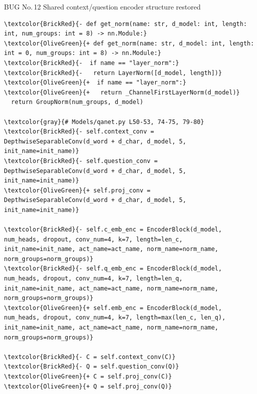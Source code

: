 \documentclass[10pt]{article}
\begin{document}
\begin{bugbox}{BUG No.\,12 \quad Shared context/question encoder structure restored}
\begin{Verbatim}[commandchars=\\\{\},fontsize=\footnotesize,breaklines=true,breaksymbol={},frame=leftline,framerule=2pt,rulecolor=\color{gray!40},xleftmargin=6pt,formatcom=\singlespacing]
\textcolor{BrickRed}{- def get_norm(name: str, d_model: int, length: int, num_groups: int = 8) -> nn.Module:}
\textcolor{OliveGreen}{+ def get_norm(name: str, d_model: int, length: int = 0, num_groups: int = 8) -> nn.Module:}
\textcolor{BrickRed}{-  if name == "layer_norm":}
\textcolor{BrickRed}{-   return LayerNorm([d_model, length])}
\textcolor{OliveGreen}{+  if name == "layer_norm":}
\textcolor{OliveGreen}{+   return _ChannelFirstLayerNorm(d_model)}
  return GroupNorm(num_groups, d_model)

\textcolor{gray}{# Models/qanet.py L50-53, 74-75, 79-80}
\textcolor{BrickRed}{- self.context_conv = DepthwiseSeparableConv(d_word + d_char, d_model, 5, init_name=init_name)}
\textcolor{BrickRed}{- self.question_conv = DepthwiseSeparableConv(d_word + d_char, d_model, 5, init_name=init_name)}
\textcolor{OliveGreen}{+ self.proj_conv = DepthwiseSeparableConv(d_word + d_char, d_model, 5, init_name=init_name)}

\textcolor{BrickRed}{- self.c_emb_enc = EncoderBlock(d_model, num_heads, dropout, conv_num=4, k=7, length=len_c, init_name=init_name, act_name=act_name, norm_name=norm_name, norm_groups=norm_groups)}
\textcolor{BrickRed}{- self.q_emb_enc = EncoderBlock(d_model, num_heads, dropout, conv_num=4, k=7, length=len_q, init_name=init_name, act_name=act_name, norm_name=norm_name, norm_groups=norm_groups)}
\textcolor{OliveGreen}{+ self.emb_enc = EncoderBlock(d_model, num_heads, dropout, conv_num=4, k=7, length=max(len_c, len_q), init_name=init_name, act_name=act_name, norm_name=norm_name, norm_groups=norm_groups)}

\textcolor{BrickRed}{- C = self.context_conv(C)}
\textcolor{BrickRed}{- Q = self.question_conv(Q)}
\textcolor{OliveGreen}{+ C = self.proj_conv(C)}
\textcolor{OliveGreen}{+ Q = self.proj_conv(Q)}


\end{Verbatim}
\end{bugbox}
\end{document}
